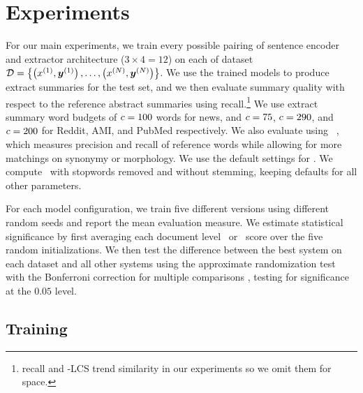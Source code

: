 \section{Experiments} \label{sec:exps}

For our main experiments, we train every possible pairing of sentence encoder
and extractor architecture ($3\times4=12$) on each of dataset $\mathcal{D} =
\left\{\left(x^{(1)}, \boldsymbol{y}^{(1)}\right),\ldots,
\left(x^{(N)}, \boldsymbol{y}^{(N)}\right) \right\}$.  We use
the trained models to produce extract summaries for the test set, and we then
evaluate summary quality with respect to the reference abstract summaries using
 recall.\footnote{ recall and \rouge-LCS trend similarity in
our experiments so we omit them for space.} We use extract summary word budgets
of $c=100$ words for news, and $c=75$, $c=290$,
and $c=200$ for Reddit, AMI, and PubMed respectively.  We also
evaluate using \meteor~\citep{banerjee2005meteor}, which measures precision and
recall of reference words while allowing for more matchings on synonymy or
morphology.  We use the default settings for \meteor. We compute \rouge~with
stopwords removed and without stemming, keeping defaults for all other
parameters.

For each model configuration, we train five different versions using different
random seeds and report the mean evaluation measure.  We estimate statistical
significance by first averaging each document level \rouge~or \meteor~score
over the five random initializations.  We then test the difference between the
best system on each dataset and all other systems using the approximate
randomization test with the Bonferroni correction for multiple comparisons
\citep{riezler2005pitfalls}, testing for significance at the $0.05$ level. 

\subsection{Training}

